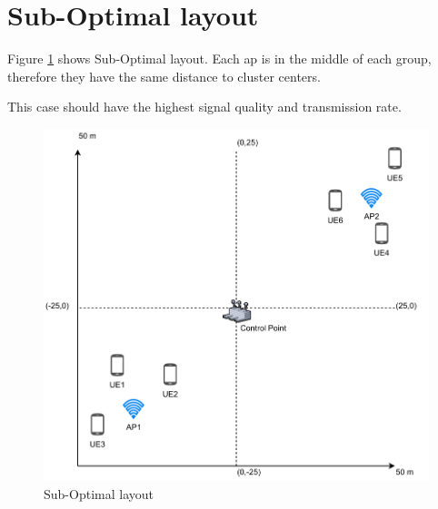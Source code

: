 \section{Sub-Optimal layout}\label{sub-optimal-layout}

Figure \ref{fig:sub-optimal-layout} shows Sub-Optimal layout. Each \gls{ap} is in the middle of each group, therefore they have the same distance to cluster centers.

This case should have the highest signal quality and transmission rate.

\begin{figure}[H]
	\centering
	\includegraphics[width=0.7\linewidth,keepaspectratio]{images/05-cases-description-Sub-optimal.pdf}
\caption{Sub-Optimal layout}
\label{fig:sub-optimal-layout}
\end{figure}
